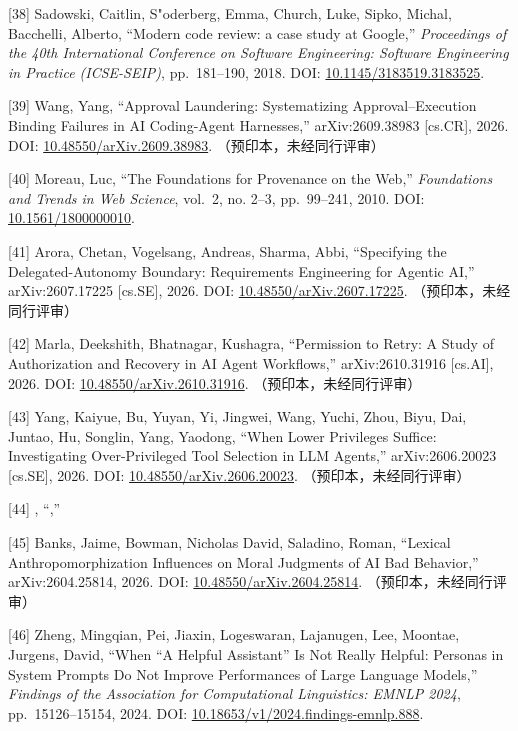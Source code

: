 \documentclass[
]{article}
\begin{document}
{[}38{]} Sadowski, Caitlin, S"oderberg, Emma, Church, Luke, Sipko,
Michal, Bacchelli, Alberto, ``Modern code review: a case study at
Google,'' \emph{Proceedings of the 40th International Conference on
Software Engineering: Software Engineering in Practice (ICSE-SEIP)},
pp.~181--190, 2018. DOI:
\href{https://doi.org/10.1145/3183519.3183525}{10.1145/3183519.3183525}.

{[}39{]} Wang, Yang, ``Approval Laundering: Systematizing
Approval--Execution Binding Failures in AI Coding-Agent Harnesses,''
arXiv:2609.38983 {[}cs.CR{]}, 2026. DOI:
\href{https://doi.org/10.48550/arXiv.2609.38983}{10.48550/arXiv.2609.38983}.
（预印本，未经同行评审）

{[}40{]} Moreau, Luc, ``The Foundations for Provenance on the Web,''
\emph{Foundations and Trends in Web Science}, vol.~2, no. 2--3,
pp.~99--241, 2010. DOI:
\href{https://doi.org/10.1561/1800000010}{10.1561/1800000010}.

{[}41{]} Arora, Chetan, Vogelsang, Andreas, Sharma, Abbi, ``Specifying
the Delegated-Autonomy Boundary: Requirements Engineering for Agentic
AI,'' arXiv:2607.17225 {[}cs.SE{]}, 2026. DOI:
\href{https://doi.org/10.48550/arXiv.2607.17225}{10.48550/arXiv.2607.17225}.
（预印本，未经同行评审）

{[}42{]} Marla, Deekshith, Bhatnagar, Kushagra, ``Permission to Retry: A
Study of Authorization and Recovery in AI Agent Workflows,''
arXiv:2610.31916 {[}cs.AI{]}, 2026. DOI:
\href{https://doi.org/10.48550/arXiv.2610.31916}{10.48550/arXiv.2610.31916}.
（预印本，未经同行评审）

{[}43{]} Yang, Kaiyue, Bu, Yuyan, Yi, Jingwei, Wang, Yuchi, Zhou, Biyu,
Dai, Juntao, Hu, Songlin, Yang, Yaodong, ``When Lower Privileges
Suffice: Investigating Over-Privileged Tool Selection in LLM Agents,''
arXiv:2606.20023 {[}cs.SE{]}, 2026. DOI:
\href{https://doi.org/10.48550/arXiv.2606.20023}{10.48550/arXiv.2606.20023}.
（预印本，未经同行评审）

{[}44{]} , ``,''

{[}45{]} Banks, Jaime, Bowman, Nicholas David, Saladino, Roman,
``Lexical Anthropomorphization Influences on Moral Judgments of AI Bad
Behavior,'' arXiv:2604.25814, 2026. DOI:
\href{https://doi.org/10.48550/arXiv.2604.25814}{10.48550/arXiv.2604.25814}.
（预印本，未经同行评审）

{[}46{]} Zheng, Mingqian, Pei, Jiaxin, Logeswaran, Lajanugen, Lee,
Moontae, Jurgens, David, ``When ``A Helpful Assistant'' Is Not Really
Helpful: Personas in System Prompts Do Not Improve Performances of Large
Language Models,'' \emph{Findings of the Association for Computational
Linguistics: EMNLP 2024}, pp.~15126--15154, 2024. DOI:
\href{https://doi.org/10.18653/v1/2024.findings-emnlp.888}{10.18653/v1/2024.findings-emnlp.888}.
\end{document}
